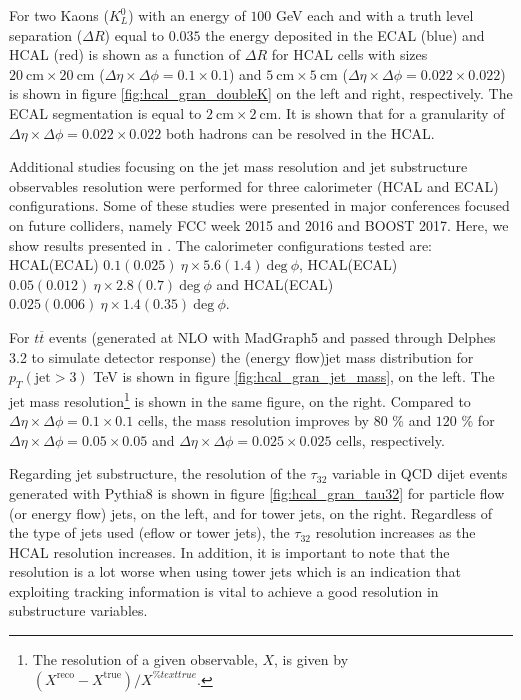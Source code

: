 For two Kaons ($K_L^0$) with an energy of $100$ GeV each and with a truth level separation ($\Delta R$) equal to $0.035$ the energy deposited in the ECAL (blue) and HCAL (red) is shown as a function of $\Delta R$ for HCAL cells with sizes $20~\text{cm}\times 20~\text{cm}$ ($\Delta \eta\times \Delta\phi=0.1\times 0.1$) and $5~\text{cm}\times 5~\text{cm}$ ($\Delta \eta\times \Delta\phi=0.022\times 0.022$) is shown in figure \ref{fig:hcal_gran_doubleK} on the left and right, respectively. The ECAL segmentation is equal to $2~\text{cm}\times 2~\text{cm}$. It is shown that for a granularity of $\Delta \eta\times \Delta\phi=0.022\times 0.022$ both hadrons can be resolved in the HCAL.

Additional studies focusing on the jet mass resolution and jet substructure observables resolution were performed for three calorimeter (HCAL and ECAL) configurations. Some of these studies were presented in major conferences focused on future colliders, namely FCC week 2015 and 2016 and BOOST 2017. Here, we show results presented in \cite{FCCweek2015,FCCweek2016,BOOST2017}. The calorimeter configurations tested are: HCAL(ECAL) $0.1(0.025)~\eta \times 5.6(1.4)~\text{deg}~\phi$, HCAL(ECAL) $0.05(0.012)~\eta \times 2.8(0.7)~\text{deg}~\phi$ and HCAL(ECAL) $0.025(0.006)~\eta \times 1.4(0.35)~\text{deg}~\phi$. 

For $t\overline{t}$ events (generated at NLO with MadGraph5 and passed through Delphes 3.2 to simulate detector response) the (energy flow)jet mass distribution for $p_T(\text{jet}>3)$ TeV is shown in figure \ref{fig:hcal_gran_jet_mass}, on the left. The jet mass resolution\footnote{The resolution of a given observable, $X$, is given by $(X^{\text{reco}}-X^{\text{true}})/X^{\%text{true}}$.} is shown in the same figure, on the right. Compared to $\Delta\eta\times\Delta\phi=0.1\times0.1$ cells, the mass resolution improves by $80$ \% and $120$ \% for $\Delta\eta\times\Delta\phi=0.05\times0.05$ and $\Delta\eta\times\Delta\phi=0.025\times0.025$ cells, respectively.

Regarding jet substructure, the resolution of the $\tau_{32}$ variable in QCD dijet events generated with Pythia8 is shown in figure \ref{fig:hcal_gran_tau32} for particle flow (or energy flow) jets, on the left, and for tower jets, on the right. Regardless of the type of jets used (eflow or tower jets), the $\tau_{32}$ resolution increases as the HCAL resolution increases. In addition, it is important to note that the resolution is a lot worse when using tower jets which is an indication that exploiting tracking information is vital to achieve a good resolution in substructure variables. 

